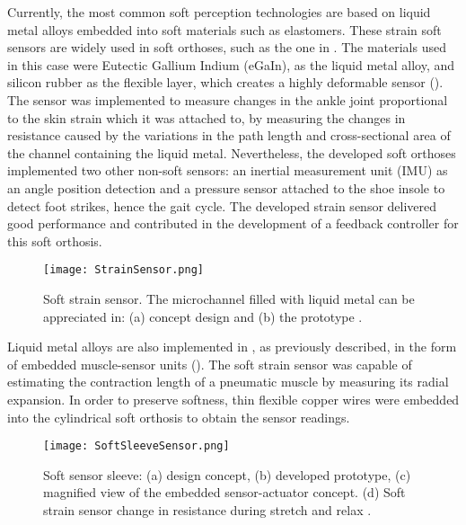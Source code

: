 Currently, the most common soft perception technologies are based on liquid metal alloys embedded into soft materials such as elastomers. These strain soft sensors are widely used in soft orthoses, such as the one in \cite{park2011bio}. The materials used in this case were Eutectic Gallium Indium (eGaIn), as the liquid metal alloy, and silicon rubber as the flexible layer, which creates a highly deformable sensor (). The sensor was implemented to measure changes in the ankle joint proportional to the skin strain which it was attached to, by measuring the changes in resistance caused by the variations in the path length and cross-sectional area of the channel containing the liquid metal. Nevertheless, the developed soft orthoses implemented two other non-soft sensors: an inertial measurement unit (IMU) as an angle position detection and a pressure sensor attached to the shoe insole to detect foot strikes, hence the gait cycle. The developed strain sensor delivered good performance and contributed in the development of a feedback controller for this soft orthosis.

\begin{figure}[hbtp!]
    \centering
    \texttt{[image: StrainSensor.png]}
    \caption[Soft strain sensor. The microchannel filled with liquid metal can be appreciated in: (a) concept design and (b) the prototype.]{Soft strain sensor. The microchannel filled with liquid metal can be appreciated in: (a) concept design and (b) the prototype \cite{park2011bio}. }
    \label{fig:strain_sensor}
\end{figure}

Liquid metal alloys are also implemented in \cite{Park2012}, as previously described, in the form of embedded muscle-sensor units (). The soft strain sensor was capable of estimating the contraction length of a pneumatic muscle by measuring its radial expansion. In order to preserve softness, thin flexible copper wires were embedded into the cylindrical soft orthosis to obtain the sensor readings.

\begin{figure}[hbtp!]
    \centering
    \texttt{[image: SoftSleeveSensor.png]}
    \caption[Soft sensor sleeve: (a) design concept, (b) developed prototype, (c) magnified view of the embedded sensor-actuator concept. (d) Soft strain sensor change in resistance during stretch and relax.]{Soft sensor sleeve: (a) design concept, (b) developed prototype, (c) magnified view of the embedded sensor-actuator concept. (d) Soft strain sensor change in resistance during stretch and relax \cite{Park2012}. }
    \label{fig:soft_sleeve_sensor}
\end{figure}

